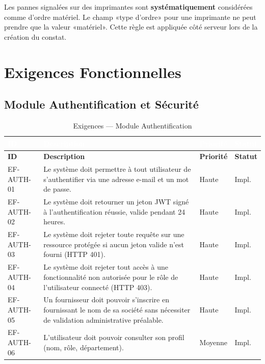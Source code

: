 \documentclass[12pt,a4paper]{report}
\begin{document}
\begin{tcolorbox}[exigbox, title=Règle de Gestion RG-01]
Les pannes signalées sur des imprimantes sont \textbf{systématiquement} considérées comme d'ordre matériel. Le champ «type d'ordre» pour une imprimante ne peut prendre que la valeur «matériel». Cette règle est appliquée côté serveur lors de la création du constat.
\end{tcolorbox}

\chapter{Exigences Fonctionnelles}

\section{Module Authentification et Sécurité}

\begin{longtable}{|C{1.8cm}|L{8.5cm}|C{2cm}|C{2cm}|}
\caption{Exigences — Module Authentification} \\
\hline
{}\textcolor{white}{\textbf{ID}} & \textcolor{white}{\textbf{Description}} & \textcolor{white}{\textbf{Priorité}} & \textcolor{white}{\textbf{Statut}} \\
\hline
\endfirsthead
\hline
\textbf{ID} & \textbf{Description} & \textbf{Priorité} & \textbf{Statut} \\
\hline
\endhead
EF-AUTH-01 & Le système doit permettre à tout utilisateur de s'authentifier via une adresse e-mail et un mot de passe. & Haute & Impl. \\
\hline
EF-AUTH-02 & Le système doit retourner un jeton JWT signé à l'authentification réussie, valide pendant 24 heures. & Haute & Impl. \\
\hline
EF-AUTH-03 & Le système doit rejeter toute requête sur une ressource protégée si aucun jeton valide n'est fourni (HTTP 401). & Haute & Impl. \\
\hline
EF-AUTH-04 & Le système doit rejeter tout accès à une fonctionnalité non autorisée pour le rôle de l'utilisateur connecté (HTTP 403). & Haute & Impl. \\
\hline
EF-AUTH-05 & Un fournisseur doit pouvoir s'inscrire en fournissant le nom de sa société sans nécessiter de validation administrative préalable. & Haute & Impl. \\
\hline
EF-AUTH-06 & L'utilisateur doit pouvoir consulter son profil (nom, rôle, département). & Moyenne & Impl. \\
\hline
\end{longtable}
\end{document}
